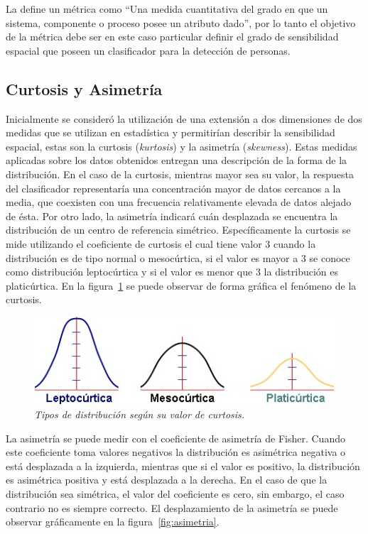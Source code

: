 La \cite{IEEE1990} define un métrica como ``Una medida cuantitativa del grado en que un sistema, componente o proceso posee un atributo dado'', por lo tanto el objetivo de la métrica debe ser en este caso particular definir el grado de sensibilidad espacial que poseen un clasificador para la detección de personas.

\subsection{Curtosis y Asimetría}
\label{propuestas:kys}

Inicialmente se consideró la utilización de una extensión a dos dimensiones de dos medidas que se utilizan en estadística y permitirían describir la sensibilidad espacial, estas son la curtosis (\textit{kurtosis}) y la asimetría (\textit{skewness}). Estas medidas aplicadas sobre los datos obtenidos entregan una descripción de la forma de la distribución. En el caso de la curtosis, mientras mayor sea su valor, la respuesta del clasificador representaría una concentración mayor de datos cercanos a la media, que coexisten con una frecuencia relativamente elevada de datos alejado de ésta. Por otro lado, la asimetría indicará cuán desplazada se encuentra la distribución de un centro de referencia simétrico. Específicamente la curtosis se mide utilizando el coeficiente de curtosis el cual tiene valor 3 cuando la distribución es de tipo normal o mesocúrtica, si el valor es mayor a 3 se conoce como distribución leptocúrtica y si el valor es menor que 3 la distribución es platicúrtica. En la figura~\ref{fig:curtosis} se puede observar de forma gráfica el fenómeno de la curtosis. 

\begin{figure}[tp]
  \centering
  \includegraphics[scale=.6]{images/curtosis}
  \caption{\em Tipos de distribución según su valor de curtosis.}  
  \label{fig:curtosis}
\end{figure}

La asimetría se puede medir con el coeficiente de asimetría de Fisher. Cuando este coeficiente toma valores negativos la distribución es asimétrica negativa o está desplazada a la izquierda, mientras que si el valor es positivo, la distribución es asimétrica positiva y está desplazada a la derecha. En el caso de que la distribución sea simétrica, el valor del coeficiente es cero, sin embargo, el caso contrario no es siempre correcto. El desplazamiento de la asimetría se puede observar gráficamente en la figura~\ref{fig:asimetria}. 

